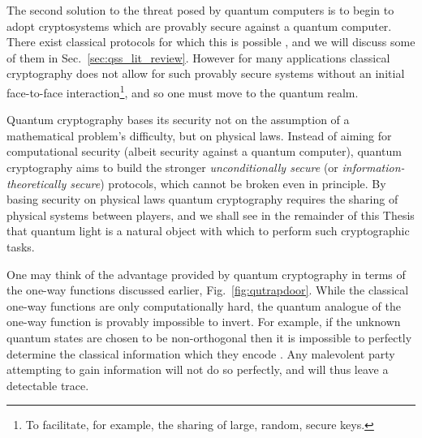 
The second solution to the threat posed by quantum computers is to begin to adopt cryptosystems which are provably secure against a quantum computer. There exist classical protocols for which this is possible \cite{Shamir1979, Blakley1979}, and we will discuss some of them in Sec.~\ref{sec:qss_lit_review}. However for many applications classical cryptography does not allow for such provably secure systems without an initial face-to-face interaction\footnote{To facilitate, for example, the sharing of large, random, secure keys.}, and so one must move to the quantum realm.

Quantum cryptography bases its security not on the assumption of a mathematical problem's difficulty, but on physical laws. Instead of aiming for computational security (albeit security against a quantum computer), quantum cryptography aims to build the stronger \emph{unconditionally secure} (or \emph{information-theoretically secure}) protocols, which cannot be broken even in principle. By basing security on physical laws quantum cryptography requires the sharing of physical systems between players, and we shall see in the remainder of this Thesis that quantum light is a natural object with which to perform such cryptographic tasks. 

One may think of the advantage provided by quantum cryptography in terms of the one-way functions discussed earlier, Fig.~\ref{fig:qutrapdoor}. While the classical one-way functions are only computationally hard, the quantum analogue of the one-way function is provably impossible to invert. For example, if the unknown quantum states are chosen to be non-orthogonal then it is impossible to perfectly determine the classical information which they encode \cite{Nielsen2010, brendon_book}. Any malevolent party attempting to gain information will not do so perfectly, and will thus leave a detectable trace.

